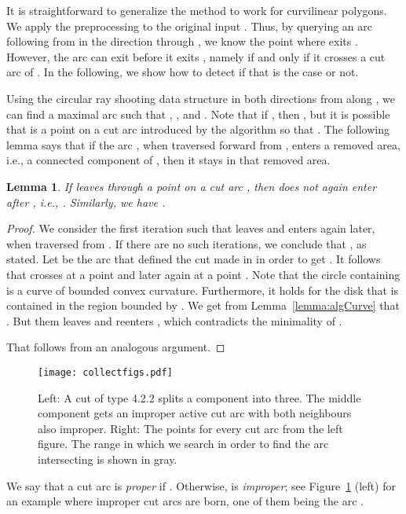 \documentclass{article}
\newtheorem{lemma}[theorem]{Lemma}
\begin{document}
It is straightforward to generalize the method to work for curvilinear polygons.
We apply the preprocessing to the original input .
Thus, by querying an arc following  from  in the direction through , we know the point where  exits .
However, the arc  can exit  before it exits , namely if and only if it crosses a cut arc of .
In the following, we show how to detect if that is the case or not.

Using the circular ray shooting data structure in both directions from  along , we can find a maximal arc  such that , , and .
Note that if , then , but it is possible that  is a point on a cut arc introduced by the algorithm so that .
The following lemma says that if the arc , when traversed forward from , enters a removed area, i.e., a connected component of , then it stays in that removed area.

\begin{lemma}\label{charArcB}
If  leaves  through a point  on a cut arc , then  does not again enter  after , i.e., .
Similarly, we have .
\end{lemma}

\begin{proof}
We consider the first iteration  such that  leaves  and enters  again later, when traversed from .
If there are no such iterations, we conclude that , as stated.
Let  be the arc that defined the cut made in  in order to get .
It follows that  crosses  at a point  and later again at a point .
Note that the circle containing  is a curve  of bounded convex curvature.
Furthermore, it holds for the disk  that  is contained in the region bounded by .
We get from Lemma~\ref{lemma:algCurve} that .
But them  leaves and reenters , which contradicts the minimality of .

That  follows from an analogous argument.
\end{proof}

\begin{figure}
\centering
\texttt{[image: collectfigs.pdf]}
\caption{Left: A cut of type 4.2.2 splits a component into three.
The middle component gets an improper active cut arc  with both neighbours also improper.
Right: The points  for every cut arc  from the left figure.
The range in which we search in order to find the arc  intersecting  is shown in gray.}
\label{fig:improper}
\end{figure}

We say that a cut arc  is \emph{proper} if .
Otherwise,  is \emph{improper}; see Figure~\ref{fig:improper} (left) for an example where improper cut arcs are born, one of them being the arc .
\end{document}
